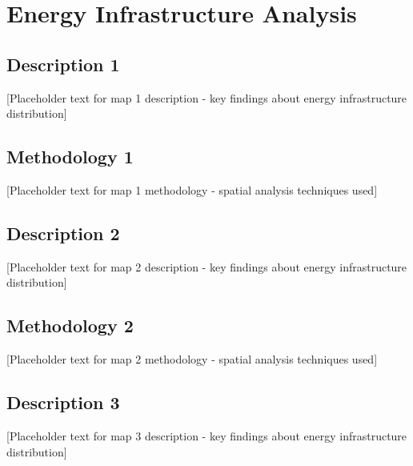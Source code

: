 \documentclass[11pt]{article}
\newcommand{\placeholderbox}[3]{%
  \fbox{\parbox[c][#2][c]{#1}{\centering\textbf{#3}}}
}
\begin{document}
\noindent\begin{minipage}[c]{0.75\textwidth}

\section{Energy Infrastructure Analysis}
\vspace{0.15cm}

\noindent\begin{minipage}[t]{0.32\textwidth}
\centering
\placeholderbox{4.5cm}{4.5cm}{Map 1\\Placeholder}
\vspace{0.25cm}
\subsection{Description 1}
[Placeholder text for map 1 description - key findings about energy infrastructure distribution]
\subsection{Methodology 1}
[Placeholder text for map 1 methodology - spatial analysis techniques used]
\end{minipage}%
\hfill%
\begin{minipage}[t]{0.32\textwidth}
\centering
\placeholderbox{4.5cm}{4.5cm}{Map 2\\Placeholder}
\vspace{0.25cm}
\subsection{Description 2}
[Placeholder text for map 2 description - key findings about energy infrastructure distribution]
\subsection{Methodology 2}
[Placeholder text for map 2 methodology - spatial analysis techniques used]
\end{minipage}%
\hfill%
\begin{minipage}[t]{0.32\textwidth}
\centering
\placeholderbox{4.5cm}{4.5cm}{Map 3\\Placeholder}
\vspace{0.25cm}
\subsection{Description 3}
[Placeholder text for map 3 description - key findings about energy infrastructure distribution]

\end{minipage}
\end{minipage}
\end{document}
